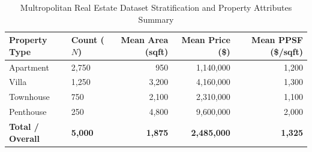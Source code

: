 \begin{table}[htbp]
\centering
\caption{Multropolitan Real Estate Dataset Stratification and Property Attributes Summary}
\label{tab:dataset_stratification}
\begin{tabular}{llrrr}
\toprule
\textbf{Property Type} & \textbf{Count ($N$)} & \textbf{Mean Area (sqft)} & \textbf{Mean Price (\$) } & \textbf{Mean PPSF (\$/sqft)} \\
\midrule
Apartment & 2,750 & 950 & 1,140,000 & 1,200 \\
Villa & 1,250 & 3,200 & 4,160,000 & 1,300 \\
Townhouse & 750 & 2,100 & 2,310,000 & 1,100 \\
Penthouse & 250 & 4,800 & 9,600,000 & 2,000 \\
\midrule
\textbf{Total / Overall} & \textbf{5,000} & \textbf{1,875} & \textbf{2,485,000} & \textbf{1,325} \\
\bottomrule
\end{tabular}
\end{table}
